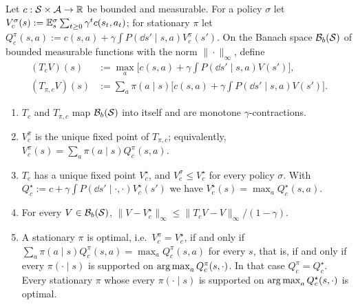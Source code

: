 \begin{lemma}\label{lem:fb-dp}
Let $c:\mathcal{S}\times\mathcal{A}\to\mathbb{R}$ be bounded and measurable.
For a policy $\sigma$ let $V^\sigma_c(s):=\mathbb{E}^\sigma_s\sum_{t\ge0}\gamma^tc(s_t,a_t)$; for stationary $\pi$ let $Q^\pi_c(s,a):=c(s,a)+\gamma\int P(\dd s'\mid s,a)V^\pi_c(s')$.
On the Banach space $\mathcal B_b(\mathcal{S})$ of bounded measurable functions with the norm $\|\cdot\|_\infty$, define
\begin{align*}
(T_cV)(s)&:=\max_a\Big[c(s,a)+\gamma\!\int\!P(\dd s'\mid s,a)V(s')\Big],\\
(T_{\pi,c}V)(s)&:=\sum_a\pi(a\mid s)\Big[c(s,a)+\gamma\!\int\!P(\dd s'\mid s,a)V(s')\Big].
\end{align*}
\begin{enumerate}[nosep,label=(\roman*)]
\item $T_c$ and $T_{\pi,c}$ map $\mathcal B_b(\mathcal{S})$ into itself and are monotone $\gamma$-contractions.
\item $V^\pi_c$ is the unique fixed point of $T_{\pi,c}$; equivalently, $V^\pi_c(s)=\sum_a\pi(a\mid s)Q^\pi_c(s,a)$.
\item $T_c$ has a unique fixed point $V^\star_c$, and $V^\sigma_c\le V^\star_c$ for every policy $\sigma$.
  With $Q^\star_c:=c+\gamma\int P(\dd s'\mid\cdot,\cdot)V^\star_c(s')$ we have $V^\star_c(s)=\max_aQ^\star_c(s,a)$.
\item For every $V\in\mathcal B_b(\mathcal{S})$, $\|V-V^\star_c\|_\infty\le\|T_cV-V\|_\infty/(1-\gamma)$.
\item A stationary $\pi$ is optimal, i.e.\ $V^\pi_c=V^\star_c$, if and only if $\sum_a\pi(a\mid s)Q^\pi_c(s,a)=\max_aQ^\pi_c(s,a)$ for every $s$, that is, if and only if every $\pi(\cdot\mid s)$ is supported on $\operatorname*{arg\,max}_aQ^\pi_c(s,\cdot)$.
  In that case $Q^\pi_c=Q^\star_c$.
  Every stationary $\pi$ whose every $\pi(\cdot\mid s)$ is supported on $\operatorname*{arg\,max}_aQ^\star_c(s,\cdot)$ is optimal.
\end{enumerate}
\end{lemma}
